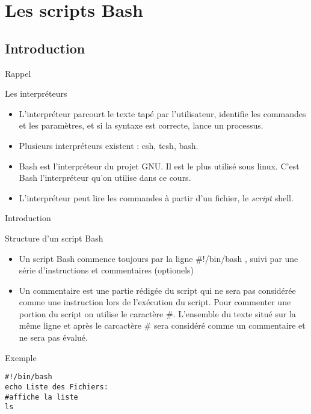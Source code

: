\section{Les scripts Bash}
\subsection{Introduction}
\begin{frame}{Rappel}
  \begin{block}{Les interpréteurs}
    \begin{itemize}
    \item L'interpréteur parcourt le texte tapé par l'utilisateur, identifie les commandes et les paramètres, et si la syntaxe est correcte, lance un processus.
    \item Plusieurs interpréteurs existent : csh, tcsh, bash.
    \item Bash est l’interpréteur du projet GNU. Il est le plus utilisé sous linux. C'est Bash l'interpréteur qu'on utilise dans ce cours.
    \item L'interpréteur peut lire les commandes à partir d'un fichier, le \emph{script} shell.
    \end{itemize}
  \end{block}
\end{frame}

\begin{frame}[fragile]{Introduction}
  \begin{block}{Structure d'un script Bash}
    \begin{itemize}
    \item Un script Bash commence toujours par la ligne \alert{\#!/bin/bash} , suivi par une série d'instructions et commentaires (optionels)
    \item Un commentaire est une partie rédigée du script qui ne sera pas considérée comme une instruction lors de l'exécution du script. Pour commenter une portion du script on utilise le caractère \#. L'ensemble du texte situé sur la même ligne et après le carcactère \# sera considéré comme un commentaire et ne sera pas évalué.
    \end{itemize}
  \end{block}

  \begin{block}{Exemple}
    \begin{center}
\begin{verbatim}
#!/bin/bash
echo Liste des Fichiers:
#affiche la liste
ls
\end{verbatim}
    \end{center}
  \end{block}
\end{frame}

